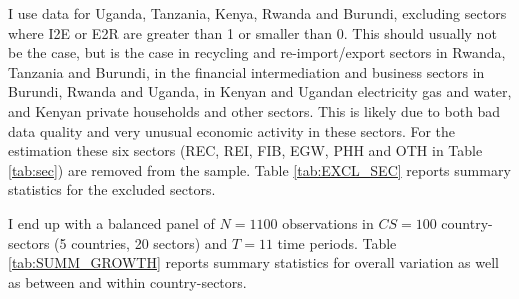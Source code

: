 \documentclass[a4paper]{article}
\begin{document}
I use data for Uganda, Tanzania, Kenya, Rwanda and Burundi, excluding sectors where I2E or E2R are greater than 1 or smaller than 0. This should usually not be the case, but is the case in recycling and re-import/export sectors in Rwanda, Tanzania and Burundi, in the financial intermediation and business sectors in Burundi, Rwanda and Uganda, in Kenyan and Ugandan electricity gas and water, and Kenyan private households and other sectors. This is likely due to both bad data quality and very unusual economic activity in these sectors. For the estimation these six sectors (REC, REI, FIB, EGW, PHH and OTH in Table \ref{tab:sec}) are removed from the sample. %
Table \ref{tab:EXCL_SEC} reports summary statistics for the excluded sectors. \newline

I end up with a balanced panel of $N = 1100$ observations in $CS = 100$ country-sectors (5 countries, 20 sectors) and $T = 11$ time periods. Table \ref{tab:SUMM_GROWTH} reports summary statistics for overall variation as well as between and within country-sectors. %
\end{document}
